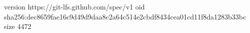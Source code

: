 version https://git-lfs.github.com/spec/v1
oid sha256:dec8659fae16c9d49d9daa8c2a64c514e2cbdf8434cea01cd11f8da1283b33bc
size 4472
